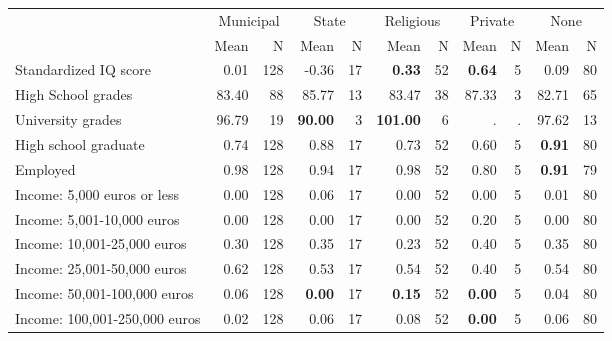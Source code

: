 \begin{tabular}{l r r r r r r r r r r}
\toprule
& \multicolumn{2}{c}{Municipal} & \multicolumn{2}{c}{State} & \multicolumn{2}{c}{Religious} & \multicolumn{2}{c}{Private} & \multicolumn{2}{c}{None} \\
& \scriptsize Mean & \scriptsize N & \scriptsize Mean & \scriptsize N & \scriptsize Mean & \scriptsize N & \scriptsize Mean & \scriptsize N & \scriptsize Mean & \scriptsize N \\
\midrule
Standardized IQ score &      0.01 &       128 &     -0.36 &        17 & \textbf{     0.33} &        52 & \textbf{     0.64} &         5 &      0.09 &        80 \\
High School grades &     83.40 &        88 &     85.77 &        13 &     83.47 &        38 &     87.33 &         3 &     82.71 &        65 \\
University grades &     96.79 &        19 & \textbf{    90.00} &         3 & \textbf{   101.00} &         6 &         . & . &     97.62 &        13 \\
High school graduate &      0.74 &       128 &      0.88 &        17 &      0.73 &        52 &      0.60 &         5 & \textbf{     0.91} &        80 \\
Employed &      0.98 &       128 &      0.94 &        17 &      0.98 &        52 &      0.80 &         5 & \textbf{     0.91} &        79 \\
Income: 5,000 euros or less &      0.00 &       128 &      0.06 &        17 &      0.00 &        52 &      0.00 &         5 &      0.01 &        80 \\
Income: 5,001-10,000 euros &      0.00 &       128 &      0.00 &        17 &      0.00 &        52 &      0.20 &         5 &      0.00 &        80 \\
Income: 10,001-25,000 euros &      0.30 &       128 &      0.35 &        17 &      0.23 &        52 &      0.40 &         5 &      0.35 &        80 \\
Income: 25,001-50,000 euros &      0.62 &       128 &      0.53 &        17 &      0.54 &        52 &      0.40 &         5 &      0.54 &        80 \\
Income: 50,001-100,000 euros &      0.06 &       128 & \textbf{     0.00} &        17 & \textbf{     0.15} &        52 & \textbf{     0.00} &         5 &      0.04 &        80 \\
Income: 100,001-250,000 euros &      0.02 &       128 &      0.06 &        17 &      0.08 &        52 & \textbf{     0.00} &         5 &      0.06 &        80 \\

\end{tabular}
